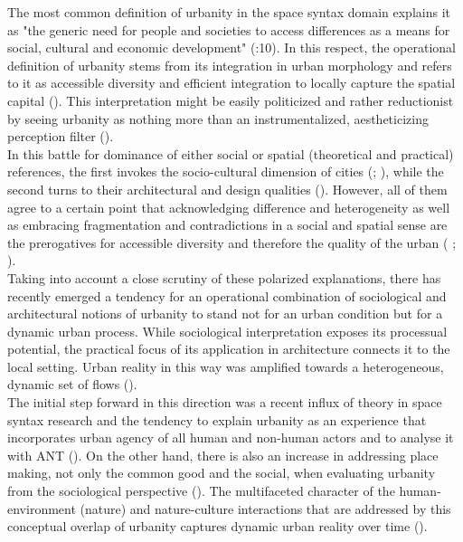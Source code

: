 \documentclass[11pt]{report}
\begin{document}
{{{The most common definition of urbanity in the space syntax domain explains it as "the generic need for people and societies to access differences as a means for social, cultural and economic development" (\href{Marcus}{\citealt{marcus_spatial_2007}}:10).
In this respect, the operational definition of urbanity stems from its integration in urban morphology  and refers to it as accessible diversity and efficient integration to locally capture the spatial capital (\href{Marcus}{\citealt{marcus_spatial_2007}}).
This interpretation might be easily politicized and rather reductionist by seeing urbanity as nothing more than an instrumentalized, aestheticizing perception filter (\href{Wuest}{\citealt{wust_urbanity_2005}}).
\\

In this battle for dominance of either social or spatial (theoretical and practical) references, the first invokes the socio-cultural dimension of cities (\href{ref}{\citealt{haussermann_urbanitet:_1992}}; \href{ref}{ \citealt{christiaanse_auf_2000}}), while the second turns to their architectural and design qualities (\cite{Neuffer 1976}).
However, all of them agree to a certain point that acknowledging difference and heterogeneity as well as embracing fragmentation and contradictions in a social and spatial sense are the prerogatives for accessible diversity and therefore the quality of the urban (\citealt{(Durth 1986: Krämer-Badoni 1996} \href{Wuest}{\citealt{wust_urbanity_2005}}; \href{Markus}{\citealt{marcus_spatial_2007}}). 
\\

Taking into account a close scrutiny of these polarized explanations, there has recently emerged a tendency for an operational combination of sociological and architectural notions of urbanity to stand not for an urban condition but for a dynamic urban process.
While sociological interpretation exposes its processual potential, the practical focus of its application in architecture connects it to the local setting.
Urban reality in this way was amplified towards a heterogeneous, dynamic set of flows (\href{de Aguiar}{\citealt{de_aguiar_douglas_vieira_what_2013}}).
\\

The initial step forward in this direction was a recent influx of theory in space syntax research and the tendency to explain urbanity as an experience that incorporates urban agency of all human and non-human actors and to analyse it with ANT (\citealt{rheintantz_narratives_2012}).
On the other hand, there is also an increase in addressing place making, not only the common good and the social, when evaluating urbanity from the sociological perspective (\href{Holden}{\citealt{holden_justifying_2015}}). 
The multifaceted character of the human-environment (nature) and nature-culture interactions that are addressed by this conceptual overlap of urbanity captures dynamic urban reality over time (\href{Tardin}{\citealt{tardin_landscape_2014}}).
\\

}}}
\end{document}
